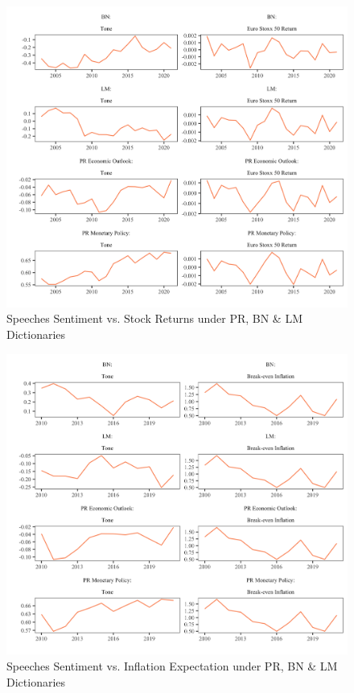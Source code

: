 \begin{figure}[H]
    \includegraphics[width = \textwidth]{figures/toneseurostoxx.png}
    \vspace{-9mm}
    \caption{Speeches Sentiment vs. Stock Returns under PR, BN \& LM Dictionaries}
    \label{fig:sentstocks}  
\end{figure}

\begin{figure}[H]
    \includegraphics[width = \textwidth]{figures/tonesinflation.png}
    \vspace{-9mm}
    \caption{Speeches Sentiment vs. Inflation Expectation under PR, BN \& LM Dictionaries}
    \label{fig:sentinflation}  
\end{figure}

